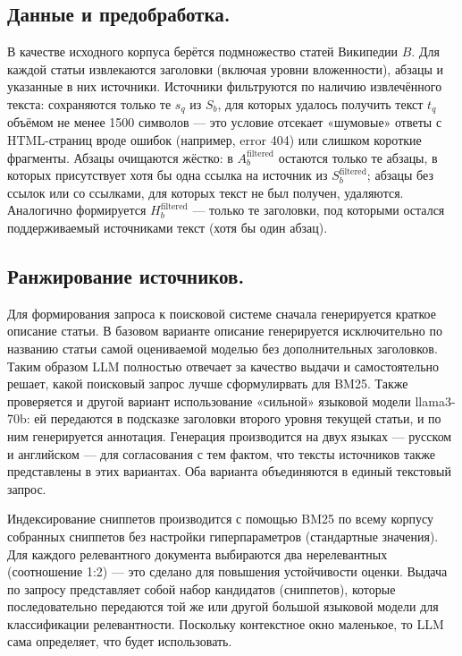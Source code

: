 \documentclass{article}
\theoremstyle{definition}
\theoremstyle{plain}
\begin{document}
\subsection*{Данные и предобработка.}
В качестве исходного корпуса берётся подмножество статей Википедии \(B\). Для каждой статьи извлекаются заголовки (включая уровни вложенности), абзацы и указанные в них источники. 
Источники фильтруются по наличию извлечённого текста: сохраняются только те \(s_q\) из \(S_b\), для которых удалось получить текст \(t_q\) объёмом не менее 1500 символов — это условие отсекает «шумовые» ответы с HTML-страниц вроде ошибок (например, error 404) или слишком короткие фрагменты. 
Абзацы очищаются жёстко: в \(A_b^{\mathrm{filtered}}\) остаются только те абзацы, в которых присутствует хотя бы одна ссылка на источник из \(S_b^{\mathrm{filtered}}\); абзацы без ссылок или со ссылками, для которых текст не был получен, удаляются. 
Аналогично формируется \(H_b^{\mathrm{filtered}}\) — только те заголовки, под которыми остался поддерживаемый источниками текст (хотя бы один абзац).

\subsection*{Ранжирование источников.}
Для формирования запроса к поисковой системе сначала генерируется краткое описание статьи.  
В базовом варианте описание генерируется исключительно по названию статьи самой оцениваемой моделью без дополнительных заголовков.
Таким образом LLM полностью отвечает за качество выдачи и самостоятельно решает, какой поисковый запрос лучше сформулирвать для BM25.
Также проверяется и другой вариант использование «сильной» языковой модели llama3-70b: ей передаются в подсказке заголовки второго уровня текущей статьи, и по ним генерируется аннотация. 
Генерация производится на двух языках — русском и английском — для согласования с тем фактом, что тексты источников также представлены в этих вариантах. 
Оба варианта объединяются в единый текстовый запрос.

Индексирование сниппетов производится с помощью BM25 по всему корпусу собранных сниппетов без настройки гиперпараметров (стандартные значения).
Для каждого релевантного документа выбираются два нерелевантных (соотношение 1:2) — это сделано для повышения устойчивости оценки.
Выдача по запросу представляет собой набор кандидатов (сниппетов), которые последовательно передаются той же или другой большой языковой модели для классификации релевантности.
Поскольку контекстное окно маленькое, то LLM сама определяет, что будет использовать.
\end{document}
